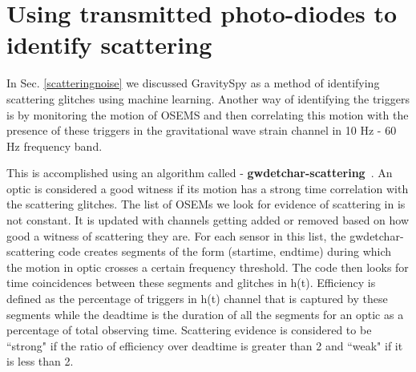\documentclass[12pt]{iopart}
\begin{document}
\par 

\vspace{0.5cm}
 


 

\section{Using transmitted photo-diodes to identify scattering}\label{transmonwitness}
In Sec. \ref{scatteringnoise} we discussed GravitySpy as a method of identifying scattering glitches using machine learning.
Another way of identifying the triggers is by monitoring the motion of OSEMS and then correlating this motion with the presence of these triggers in the gravitational wave strain channel in 10 Hz - 60 Hz frequency band.

This is accomplished using an algorithm called - \textbf{gwdetchar-scattering}~\cite{alex_l_urban_2019_3526829}. An optic is considered a good witness if its motion has a strong time correlation with the scattering glitches. The list of OSEMs we look for evidence of scattering in is not constant. It is updated with channels getting added or removed based on how good a witness of scattering they are. For each sensor in this list, the gwdetchar-scattering code creates segments of the form (startime, endtime) during which the motion in optic crosses a certain frequency threshold.  The code then looks for time coincidences between these segments and glitches in h(t). Efficiency is defined as the percentage of triggers in h(t) channel that is captured by these segments while the deadtime is the duration of all the segments for an optic as a percentage of total observing time. Scattering evidence is considered to be ``strong" if the ratio of efficiency over deadtime is greater than 2 and ``weak" if it is less than 2. 
\end{document}
